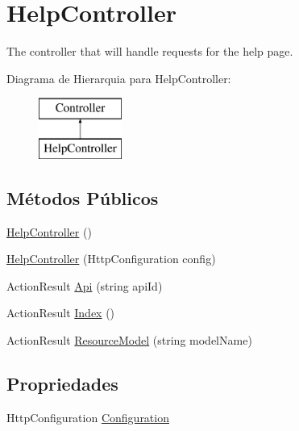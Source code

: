 \hypertarget{classApi3Layers_1_1Areas_1_1HelpPage_1_1Controllers_1_1HelpController}{}\section{Help\+Controller}
\label{classApi3Layers_1_1Areas_1_1HelpPage_1_1Controllers_1_1HelpController}


The controller that will handle requests for the help page.  


Diagrama de Hierarquia para Help\+Controller\+:\begin{figure}[H]
\begin{center}
\leavevmode
\includegraphics[height=2.000000cm]{d5/d9e/classApi3Layers_1_1Areas_1_1HelpPage_1_1Controllers_1_1HelpController}
\end{center}
\end{figure}
\subsection*{Métodos Públicos}
\begin{DoxyCompactItemize}
\item 
\hyperlink{classApi3Layers_1_1Areas_1_1HelpPage_1_1Controllers_1_1HelpController_a83181268f5f82b22c63b3f978fa4c32c}{Help\+Controller} ()
\item 
\hyperlink{classApi3Layers_1_1Areas_1_1HelpPage_1_1Controllers_1_1HelpController_a7fb80807bac7887eefc2cf102ad34d7a}{Help\+Controller} (Http\+Configuration config)
\item 
Action\+Result \hyperlink{classApi3Layers_1_1Areas_1_1HelpPage_1_1Controllers_1_1HelpController_a7ab3cc2e28440430c53c8651bee60e72}{Api} (string api\+Id)
\item 
Action\+Result \hyperlink{classApi3Layers_1_1Areas_1_1HelpPage_1_1Controllers_1_1HelpController_a82bdd581a9c68d02c11ac8160aa5d60b}{Index} ()
\item 
Action\+Result \hyperlink{classApi3Layers_1_1Areas_1_1HelpPage_1_1Controllers_1_1HelpController_a6833392bcc6273de228714a6f512c2bc}{Resource\+Model} (string model\+Name)
\end{DoxyCompactItemize}
\subsection*{Propriedades}
\begin{DoxyCompactItemize}
\item 
Http\+Configuration \hyperlink{classApi3Layers_1_1Areas_1_1HelpPage_1_1Controllers_1_1HelpController_aa3cd9c8489aca78a2da59567fc5207ba}{Configuration}
\end{DoxyCompactItemize}
